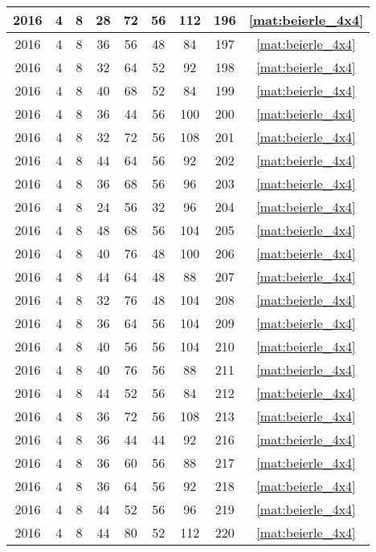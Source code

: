 \begin{longtable}{|c|c|c|c|c|c|c|c|c|}
2016 & 4 & 8 & 28 & 72 & 56 & 112 & 196 & \eqref{mat:beierle_4x4} \\ \hline 
2016 & 4 & 8 & 36 & 56 & 48 & 84 & 197 & \eqref{mat:beierle_4x4} \\ \hline 
2016 & 4 & 8 & 32 & 64 & 52 & 92 & 198 & \eqref{mat:beierle_4x4} \\ \hline 
2016 & 4 & 8 & 40 & 68 & 52 & 84 & 199 & \eqref{mat:beierle_4x4} \\ \hline 
2016 & 4 & 8 & 36 & 44 & 56 & 100 & 200 & \eqref{mat:beierle_4x4} \\ \hline 
2016 & 4 & 8 & 32 & 72 & 56 & 108 & 201 & \eqref{mat:beierle_4x4} \\ \hline 
2016 & 4 & 8 & 44 & 64 & 56 & 92 & 202 & \eqref{mat:beierle_4x4} \\ \hline 
2016 & 4 & 8 & 36 & 68 & 56 & 96 & 203 & \eqref{mat:beierle_4x4} \\ \hline 
2016 & 4 & 8 & 24 & 56 & 32 & 96 & 204 & \eqref{mat:beierle_4x4} \\ \hline 
2016 & 4 & 8 & 48 & 68 & 56 & 104 & 205 & \eqref{mat:beierle_4x4} \\ \hline 
2016 & 4 & 8 & 40 & 76 & 48 & 100 & 206 & \eqref{mat:beierle_4x4} \\ \hline 
2016 & 4 & 8 & 44 & 64 & 48 & 88 & 207 & \eqref{mat:beierle_4x4} \\ \hline 
2016 & 4 & 8 & 32 & 76 & 48 & 104 & 208 & \eqref{mat:beierle_4x4} \\ \hline 
2016 & 4 & 8 & 36 & 64 & 56 & 104 & 209 & \eqref{mat:beierle_4x4} \\ \hline 
2016 & 4 & 8 & 40 & 56 & 56 & 104 & 210 & \eqref{mat:beierle_4x4} \\ \hline 
2016 & 4 & 8 & 40 & 76 & 56 & 88 & 211 & \eqref{mat:beierle_4x4} \\ \hline 
2016 & 4 & 8 & 44 & 52 & 56 & 84 & 212 & \eqref{mat:beierle_4x4} \\ \hline 
2016 & 4 & 8 & 36 & 72 & 56 & 108 & 213 & \eqref{mat:beierle_4x4} \\ \hline 
2016 & 4 & 8 & 36 & 44 & 44 & 92 & 216 & \eqref{mat:beierle_4x4} \\ \hline 
2016 & 4 & 8 & 36 & 60 & 56 & 88 & 217 & \eqref{mat:beierle_4x4} \\ \hline 
2016 & 4 & 8 & 36 & 64 & 56 & 92 & 218 & \eqref{mat:beierle_4x4} \\ \hline 
2016 & 4 & 8 & 44 & 52 & 56 & 96 & 219 & \eqref{mat:beierle_4x4} \\ \hline 
2016 & 4 & 8 & 44 & 80 & 52 & 112 & 220 & \eqref{mat:beierle_4x4} \\ \hline 

\end{longtable}
